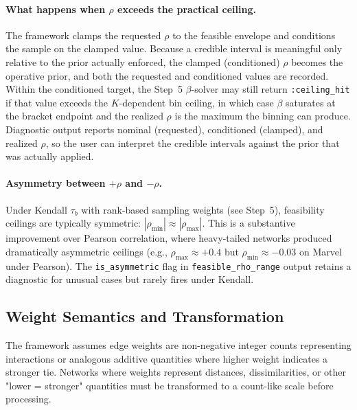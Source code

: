 \documentclass[11pt]{article}
\begin{document}
\paragraph{What happens when $\rho$ exceeds the practical ceiling.} The framework clamps the requested $\rho$ to the feasible envelope and conditions the sample on the clamped value. Because a credible interval is meaningful only relative to the prior actually enforced, the clamped (conditioned) $\rho$ becomes the operative prior, and both the requested and conditioned values are recorded. Within the conditioned target, the Step~5 $\beta$-solver may still return \texttt{:ceiling\_hit} if that value exceeds the $K$-dependent bin ceiling, in which case $\beta$ saturates at the bracket endpoint and the realized $\rho$ is the maximum the binning can produce. Diagnostic output reports nominal (requested), conditioned (clamped), and realized $\rho$, so the user can interpret the credible intervals against the prior that was actually applied.

\paragraph{Asymmetry between $+\rho$ and $-\rho$.} Under Kendall $\tau_b$ with rank-based sampling weights (see Step~5), feasibility ceilings are typically symmetric: $|\rho_{\min}| \approx |\rho_{\max}|$. This is a substantive improvement over Pearson correlation, where heavy-tailed networks produced dramatically asymmetric ceilings (e.g., $\rho_{\max} \approx +0.4$ but $\rho_{\min} \approx -0.03$ on Marvel under Pearson). The \texttt{is\_asymmetric} flag in \texttt{feasible\_rho\_range} output retains a diagnostic for unusual cases but rarely fires under Kendall.

\subsection{Weight Semantics and Transformation}
\label{sec:weight-semantics}

The framework assumes edge weights are non-negative integer counts representing interactions or analogous additive quantities where higher weight indicates a stronger tie. Networks where weights represent distances, dissimilarities, or other "lower = stronger" quantities must be transformed to a count-like scale before processing.
\end{document}
